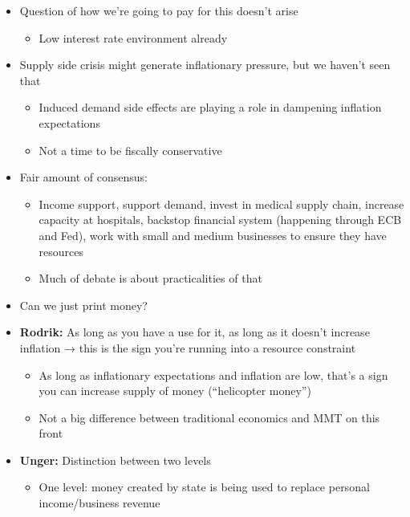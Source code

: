 \begin{itemize}
\tightlist
\item
  Question of how we're going to pay for this doesn't arise

  \begin{itemize}
  \tightlist
  \item
    Low interest rate environment already
  \end{itemize}
\item
  Supply side crisis might generate inflationary pressure, but we
  haven't seen that

  \begin{itemize}
  \tightlist
  \item
    Induced demand side effects are playing a role in dampening
    inflation expectations
  \item
    Not a time to be fiscally conservative
  \end{itemize}
\item
  Fair amount of consensus:

  \begin{itemize}
  \tightlist
  \item
    Income support, support demand, invest in medical supply chain,
    increase capacity at hospitals, backstop financial system (happening
    through ECB and Fed), work with small and medium businesses to
    ensure they have resources
  \item
    Much of debate is about practicalities of that
  \end{itemize}
\item
  Can we just print money?
\item
  \textbf{Rodrik:} As long as you have a use for it, as long as it
  doesn't increase inflation → this is the sign you're running into a
  resource constraint

  \begin{itemize}
  \tightlist
  \item
    As long as inflationary expectations and inflation are low, that's a
    sign you can increase supply of money (``helicopter money'')
  \item
    Not a big difference between traditional economics and MMT on this
    front
  \end{itemize}
\item
  \textbf{Unger:} Distinction between two levels

  \begin{itemize}
  \tightlist
  \item
    One level: money created by state is being used to replace personal
    income/business revenue


\end{itemize}
\end{itemize}
